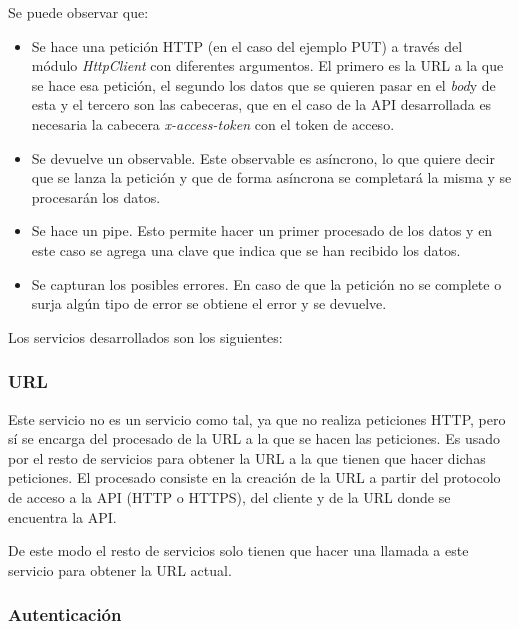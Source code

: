 \bigskip
Se puede observar que:
\begin{itemize}
	\item Se hace una petición HTTP (en el caso del ejemplo PUT) a través del módulo \textit{HttpClient} con diferentes argumentos. El primero es la URL a la que se hace esa petición, el segundo los datos que se quieren pasar en el \textit{bod}y de esta y el tercero son las cabeceras, que en el caso de la API desarrollada es necesaria la cabecera \textit{x-access-token} con el token de acceso.
	\item Se devuelve un observable. Este observable es asíncrono, lo que quiere decir que se lanza la petición y que de forma asíncrona se completará la misma y se procesarán los datos.
	\item Se hace un pipe. Esto permite hacer un primer procesado de los datos y en este caso se agrega una clave que indica que se han recibido los datos.
	\item Se capturan los posibles errores. En caso de que la petición no se complete o surja algún tipo de error se obtiene el error y se devuelve.
\end{itemize}


\bigskip
Los servicios desarrollados son los siguientes:

\subsubsection{URL}

Este servicio no es un servicio como tal, ya que no realiza peticiones HTTP, pero sí se encarga del procesado  de la URL a la que se hacen las peticiones. Es usado por el resto de servicios para obtener la URL a la que tienen que hacer dichas peticiones. El procesado consiste en la creación de la URL a partir del protocolo de acceso a la API (HTTP o HTTPS), del cliente y de la URL donde se encuentra la API.

\bigskip
De este modo el resto de servicios solo tienen que hacer una llamada a este servicio para obtener la URL actual.


\subsubsection{Autenticación}

